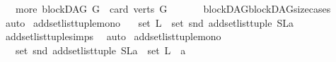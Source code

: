 \begin{isabellebody}
\ \ {\isacharbar}{\kern0pt}\ {\isacharparenleft}{\kern0pt}more{\isacharparenright}{\kern0pt}\ {\isachardoublequoteopen}blockDAG\ G\ {\isasymand}\ card\ {\isacharparenleft}{\kern0pt}verts\ G{\isacharparenright}{\kern0pt}\ {\isachargreater}{\kern0pt}\ {}{\isachardoublequoteclose}\isanewline
%
\isadelimproof
\ \ %
\endisadelimproof
%
\isatagproof
{}\isamarkupfalse%
\ \ blockDAG{\isachardot}{\kern0pt}blockDAG{\isacharunderscore}{\kern0pt}size{\isacharunderscore}{\kern0pt}cases\ \isamarkupfalse%
\ auto%
\endisatagproof
{\isafoldproof}%
%
\isadelimproof
%
\endisadelimproof
%
\isadelimdocument
%
\endisadelimdocument
%
\isatagdocument
%
\isamarkuptrue%
%
\endisatagdocument
{\isafolddocument}%
%
\isadelimdocument
%
\endisadelimdocument
{}\isamarkupfalse%
\ add{\isacharunderscore}{\kern0pt}set{\isacharunderscore}{\kern0pt}list{\isacharunderscore}{\kern0pt}tuple{\isacharunderscore}{\kern0pt}mono{\isacharcolon}{\kern0pt}\isanewline
\ \ \ {\isachardoublequoteopen}set\ L\ {\isasymsubseteq}\ set\ {\isacharparenleft}{\kern0pt}snd\ {\isacharparenleft}{\kern0pt}add{\isacharunderscore}{\kern0pt}set{\isacharunderscore}{\kern0pt}list{\isacharunderscore}{\kern0pt}tuple\ {\isacharparenleft}{\kern0pt}{\isacharparenleft}{\kern0pt}S{\isacharcomma}{\kern0pt}L{\isacharparenright}{\kern0pt}{\isacharcomma}{\kern0pt}a{\isacharparenright}{\kern0pt}{\isacharparenright}{\kern0pt}{\isacharparenright}{\kern0pt}{\isachardoublequoteclose}\isanewline
%
\isadelimproof
\ \ %
\endisadelimproof
%
\isatagproof
{}\isamarkupfalse%
\ add{\isacharunderscore}{\kern0pt}set{\isacharunderscore}{\kern0pt}list{\isacharunderscore}{\kern0pt}tuple{\isachardot}{\kern0pt}simps\ \isamarkupfalse%
\ auto%
\endisatagproof
{\isafoldproof}%
%
\isadelimproof
\isanewline
%
\endisadelimproof
\isanewline
{}\isamarkupfalse%
\ add{\isacharunderscore}{\kern0pt}set{\isacharunderscore}{\kern0pt}list{\isacharunderscore}{\kern0pt}tuple{\isacharunderscore}{\kern0pt}mono{}{\isacharcolon}{\kern0pt}\isanewline
\ \ \ {\isachardoublequoteopen}set\ {\isacharparenleft}{\kern0pt}snd\ {\isacharparenleft}{\kern0pt}add{\isacharunderscore}{\kern0pt}set{\isacharunderscore}{\kern0pt}list{\isacharunderscore}{\kern0pt}tuple\ {\isacharparenleft}{\kern0pt}{\isacharparenleft}{\kern0pt}S{\isacharcomma}{\kern0pt}L{\isacharparenright}{\kern0pt}{\isacharcomma}{\kern0pt}a{\isacharparenright}{\kern0pt}{\isacharparenright}{\kern0pt}{\isacharparenright}{\kern0pt}\ {\isasymsubseteq}\ set\ L\ {\isasymunion}\ {\isacharbraceleft}{\kern0pt}a{\isacharbraceright}{\kern0pt}\ {\isachardoublequoteclose}\isanewline

\end{isabellebody}
